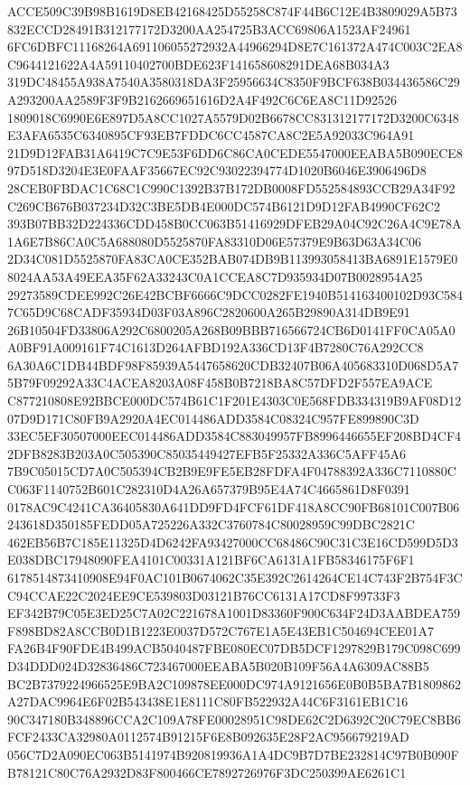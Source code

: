 \documentclass[UTF8,fontset=fandol,zihao=-4,a4paper]{ctexart}
\begin{document}
{{ACCE509C39B98B1619D8EB42168425D55258C874F44B6C12E4B3809029A5B73832ECCD28491B312177172D3200AA254725B3ACC69806A1523AF24961
6FC6DBFC11168264A691106055272932A44966294D8E7C161372A474C003C2EA8C9644121622A4A59110402700BDE623F141658608291DEA68B034A3
319DC48455A938A7540A3580318DA3F25956634C8350F9BCF638B034436586C29A293200AA2589F3F9B2162669651616D2A4F492C6C6EA8C11D92526
1809018C6990E6E897D5A8CC1027A5579D02B6678CC831312177172D3200C6348E3AFA6535C6340895CF93EB7FDDC6CC4587CA8C2E5A92033C964A91
21D9D12FAB31A6419C7C9E53F6DD6C86CA0CEDE5547000EEABA5B090ECE897D518D3204E3E0FAAF35667EC92C93022394774D1020B6046E3906496D8
28CEB0FBDAC1C68C1C990C1392B37B172DB0008FD552584893CCB29A34F92C269CB676B037234D32C3BE5DB4E000DC574B6121D9D12FAB4990CF62C2
393B07BB32D224336CDD458B0CC063B51416929DFEB29A04C92C26A4C9E78A1A6E7B86CA0C5A688080D5525870FA83310D06E57379E9B63D63A34C06
2D34C081D5525870FA83CA0CE352BAB074DB9B113993058413BA6891E1579E08024AA53A49EEA35F62A33243C0A1CCEA8C7D935934D07B0028954A25
29273589CDEE992C26E42BCBF6666C9DCC0282FE1940B514163400102D93C5847C65D9C68CADF35934D03F03A896C2820600A265B29890A314DB9E91
26B10504FD33806A292C6800205A268B09BBB716566724CB6D0141FF0CA05A0A0BF91A009161F74C1613D264AFBD192A336CD13F4B7280C76A292CC8
6A30A6C1DB44BDF98F85939A5447658620CDB32407B06A405683310D068D5A75B79F09292A33C4ACEA8203A08F458B0B7218BA8C57DFD2F557EA9ACE
C877210808E92BBCE000DC574B61C1F201E4303C0E568FDB334319B9AF08D1207D9D171C80FB9A2920A4EC014486ADD3584C08324C957FE899890C3D
33EC5EF30507000EEC014486ADD3584C883049957FB8996446655EF208BD4CF42DFB8283B203A0C505390C85035449427EFB5F25332A336C5AFF45A6
7B9C05015CD7A0C505394CB2B9E9FE5EB28FDFA4F04788392A336C7110880CC063F1140752B601C282310D4A26A657379B95E4A74C4665861D8F0391
0178AC9C4241CA36405830A641DD9FD4FCF61DF418A8CC90FB68101C007B06243618D350185FEDD05A725226A332C3760784C80028959C99DBC2821C
462EB56B7C185E11325D4D6242FA93427000CC68486C90C31C3E16CD599D5D3E038DBC17948090FEA4101C00331A121BF6CA6131A1FB58346175F6F1
6178514873410908E94F0AC101B0674062C35E392C2614264CE14C743F2B754F3CC94CCAE22C2024EE9CE539803D03121B76CC6131A17CD8F99733F3
EF342B79C05E3ED25C7A02C221678A1001D83360F900C634F24D3AABDEA759F898BD82A8CCB0D1B1223E0037D572C767E1A5E43EB1C504694CEE01A7
FA26B4F90FDE4B499ACB5040487FBE080EC07DB5DCF1297829B179C098C699D34DDD024D32836486C723467000EEABA5B020B109F56A4A6309AC88B5
BC2B7379224966525E9BA2C109878EE000DC974A9121656E0B0B5BA7B1809862A27DAC9964E6F02B543438E1E8111C80FB522932A44C6F3161EB1C16
90C347180B348896CCA2C109A78FE00028951C98DE62C2D6392C20C79EC8BB6FCF2433CA32980A0112574B91215F6E8B092635E28F2AC956679219AD
056C7D2A090EC063B5141974B920819936A1A4DC9B7D7BE232814C97B0B090FB78121C80C76A2932D83F800466CE7892726976F3DC250399AE6261C1
}}
\end{document}
